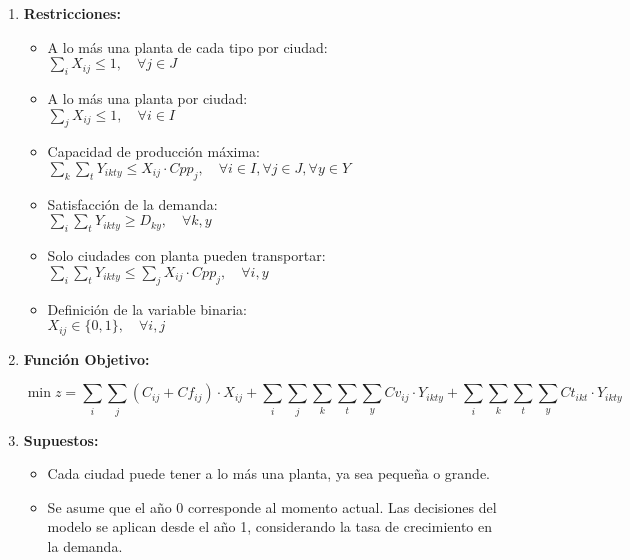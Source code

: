 \documentclass[a4paper]{article}
\begin{document}
\begin{enumerate}
        \item \textbf{Restricciones:}
        \begin{itemize}
            \item A lo m\'as una planta de cada tipo por ciudad: \\ $\sum_{i} X_{ij} \leq 1, \quad \forall j \in J$
            \item A lo m\'as una planta por ciudad: \\ $\sum_{j} X_{ij} \leq 1, \quad \forall i \in I$
            \item Capacidad de producci\'on m\'axima: \\ $\sum_{k} \sum_{t} Y_{ikty} \leq X_{ij} \cdot Cpp_{j}, \quad \forall i \in I, \forall j \in J, \forall y \in Y$
            \item Satisfacci\'on de la demanda: \\ $\sum_{i} \sum_{t} Y_{ikty} \geq D_{ky}, \quad \forall k, y$
            \item Solo ciudades con planta pueden transportar: \\ $\sum_{i} \sum_{t} Y_{ikty} \leq \sum_{j} X_{ij} \cdot Cpp_{j}, \quad \forall i, y$
            \item Definici\'on de la variable binaria: \\ $X_{ij} \in \{0,1\}, \quad \forall i, j$
        \end{itemize}

        
        \item \textbf{Funci\'on Objetivo:}
        
        \begin{equation*}
            \min 
                z = \sum_{i} \sum_{j} (C_{ij} + Cf_{ij}) \cdot X_{ij} 
                + \sum_{i} \sum_{j} \sum_{k} \sum_{t} \sum_{y} Cv_{ij} \cdot Y_{ikty} 
                + \sum_{i} \sum_{k} \sum_{t} \sum_{y} Ct_{ikt} \cdot Y_{ikty}
     
        \end{equation*}
        
        \item \textbf{Supuestos:}
        \begin{itemize}
            \item Cada ciudad puede tener a lo m\'as una planta, ya sea peque\~na o grande.
            \item Se asume que el a\~no 0 corresponde al momento actual. Las decisiones del modelo se aplican desde el a\~no 1, considerando la tasa de crecimiento en la demanda.
        \end{itemize}
    \end{enumerate}
\end{document}
